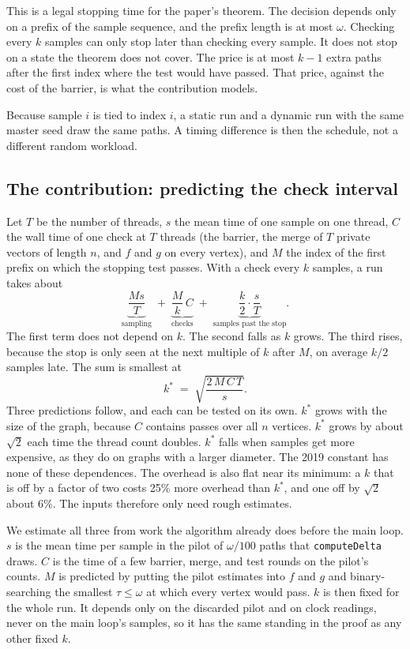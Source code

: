\documentclass[11pt]{article}
\begin{document}
This is a legal stopping time for the paper's theorem. The decision depends only on a prefix of the sample sequence, and the prefix length is at most $\omega$. Checking every $k$ samples can only stop later than checking every sample. It does not stop on a state the theorem does not cover. The price is at most $k-1$ extra paths after the first index where the test would have passed. That price, against the cost of the barrier, is what the contribution models.

Because sample $i$ is tied to index $i$, a static run and a dynamic run with the same master seed draw the same paths. A timing difference is then the schedule, not a different random workload.

\subsection{The contribution: predicting the check interval}
\label{sec:plan-contribution}

Let $T$ be the number of threads, $s$ the mean time of one sample on one thread, $C$ the wall time of one check at $T$ threads (the barrier, the merge of $T$ private vectors of length $n$, and $f$ and $g$ on every vertex), and $M$ the index of the first prefix on which the stopping test passes. With a check every $k$ samples, a run takes about
\[
\underbrace{\frac{M s}{T}}_{\text{sampling}}
\;+\;
\underbrace{\frac{M}{k}\,C}_{\text{checks}}
\;+\;
\underbrace{\frac{k}{2}\cdot\frac{s}{T}}_{\text{samples past the stop}} .
\]
The first term does not depend on $k$. The second falls as $k$ grows. The third rises, because the stop is only seen at the next multiple of $k$ after $M$, on average $k/2$ samples late. The sum is smallest at
\[
k^\ast \;=\; \sqrt{\frac{2\,M\,C\,T}{s}} .
\]
Three predictions follow, and each can be tested on its own. $k^\ast$ grows with the size of the graph, because $C$ contains passes over all $n$ vertices. $k^\ast$ grows by about $\sqrt{2}$ each time the thread count doubles. $k^\ast$ falls when samples get more expensive, as they do on graphs with a larger diameter. The 2019 constant has none of these dependences. The overhead is also flat near its minimum: a $k$ that is off by a factor of two costs 25\% more overhead than $k^\ast$, and one off by $\sqrt{2}$ about 6\%. The inputs therefore only need rough estimates.

We estimate all three from work the algorithm already does before the main loop. $s$ is the mean time per sample in the pilot of $\omega/100$ paths that \texttt{computeDelta} draws. $C$ is the time of a few barrier, merge, and test rounds on the pilot's counts. $M$ is predicted by putting the pilot estimates into $f$ and $g$ and binary-searching the smallest $\tau\le\omega$ at which every vertex would pass. $k$ is then fixed for the whole run. It depends only on the discarded pilot and on clock readings, never on the main loop's samples, so it has the same standing in the proof as any other fixed $k$.
\end{document}

